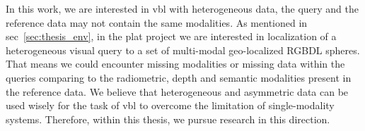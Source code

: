 	In this work, we are interested in \ac{vbl} with heterogeneous data, \ie the query and the reference data may not contain the same modalities. As mentioned in \acl{sec}~\ref{sec:thesis_env}, in the \ac{plat} project we are interested in localization of a heterogeneous visual query to a set of multi-modal geo-localized RGBDL spheres. That means we could encounter missing modalities or missing data within the queries comparing to the radiometric, depth and semantic modalities present in the reference data. We believe that heterogeneous and asymmetric data can be used wisely for the task of \acl{vbl} to overcome the limitation of single-modality systems. Therefore, within this thesis, we pursue research in this direction.
